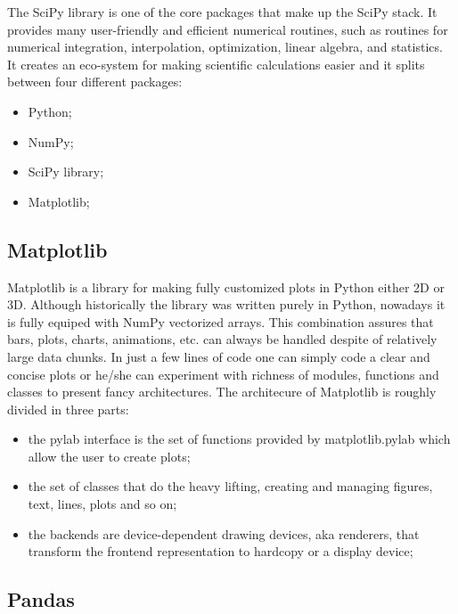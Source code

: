 \documentclass[a4paper,oneside,openright,11pt]{book}
\begin{document}
The SciPy \cite{scp} library is one of the core packages that make up the SciPy stack. It provides many user-friendly and efficient numerical routines, such as routines for numerical integration, interpolation, optimization, linear algebra, and statistics. It creates an eco-system for making scientific calculations easier and it splits between four different packages:

\begin{itemize}
    \item Python;
    \item NumPy;
    \item SciPy library;
    \item Matplotlib;
\end{itemize}


\subsection{Matplotlib}

Matplotlib \cite{mpl} \cite{Hunter:2007} is a library for making fully customized plots in Python either 2D or 3D. Although historically the library was written purely in Python, nowadays it is fully equiped with NumPy vectorized arrays. This combination assures that bars, plots, charts, animations, etc. can always be handled despite of relatively large data chunks. In just a few lines of code one can simply code a clear and concise plots or he/she can experiment with richness of modules, functions and classes to present fancy architectures. The architecure of Matplotlib is roughly divided in three parts:

\begin{itemize}
    \item the pylab interface is the set of functions provided by matplotlib.pylab which allow the user to create plots;
    \item the set of classes that do the heavy lifting, creating and managing figures, text, lines, plots and so on;
    \item the backends are device-dependent drawing devices, aka renderers, that transform the frontend representation to hardcopy or a display device;
\end{itemize}



\subsection{Pandas}
\end{document}
